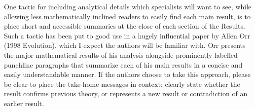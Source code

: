 \documentclass[10pt,letterpaper]{article}
\begin{document}
One tactic for including analytical details which specialists will want to see, while allowing less mathematically inclined readers to easily find each main result, is to place short and accessible summaries at the close of each section of the Results. Such a tactic has been put to good use in a hugely influential paper by Allen Orr (1998 Evolution), which I expect the authors will be familiar with. Orr presents the major mathematical results of his analysis alongside prominently labelled punchline paragraphs that summarize each of his main results in a concise and easily understandable manner. If the authors choose to take this approach, please be clear to place the take-home messages in context: clearly state whether the result confirms previous theory, or represents a new result or contradiction of an earlier result.
\end{document}
